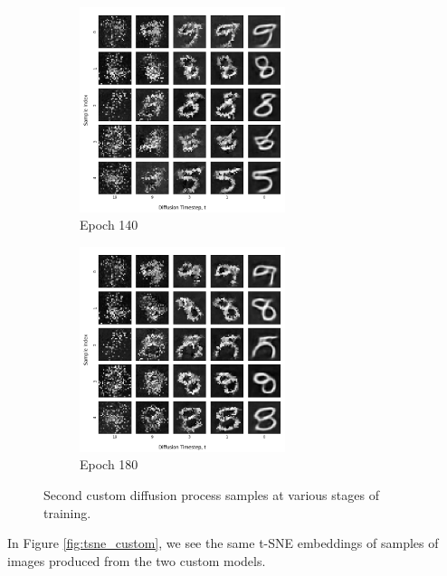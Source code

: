 \documentclass[12pt]{article}
\begin{document}
\begin{figure}[hp]
    \begin{subfigure}{0.49\textwidth}
    \includegraphics[width=0.9\linewidth, height=6cm, center]{figures/diffusion_plot_10_0140.png}
    \caption{Epoch 140}
    \label{fig:10_140}
    \end{subfigure}
    \begin{subfigure}{0.49\textwidth}
    \includegraphics[width=0.9\linewidth, height=6cm, center]{figures/diffusion_plot_10_0180.png}
    \caption{Epoch 180}
    \label{fig:10_180}
    \end{subfigure}

    \caption{Second custom diffusion process samples at various stages of training.}
    \label{fig:diffusion_10}
\end{figure}

In Figure \ref{fig:tsne_custom}, we see the same t-SNE embeddings of samples of images produced from the two custom models.
\end{document}
